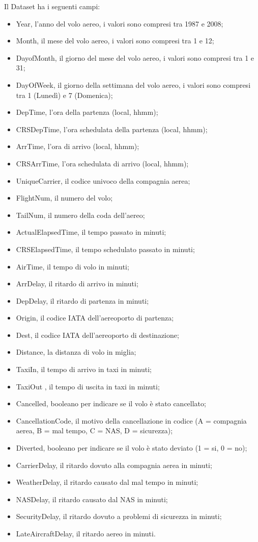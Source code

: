 \documentclass[11pt]{article} %
\begin{document}
Il Dataset ha i seguenti campi:
\begin{itemize}
\item    Year,  l'anno del volo aereo, i valori sono compresi tra 1987 e 2008;
\item    Month,  il mese del volo aereo, i valori sono compresi tra 1 e 12;
\item    DayofMonth, il giorno del mese del volo aereo, i valori sono compresi tra 1 e 31;
\item    DayOfWeek,  il giorno della settimana del volo aereo, i valori sono compresi tra 1 (Lunedì) e 7 (Domenica);
\item    DepTime, l'ora della partenza (local, hhmm);
\item    CRSDepTime, l'ora schedulata della partenza (local, hhmm);
\item    ArrTime, l'ora di arrivo (local, hhmm);
\item    CRSArrTime, l'ora schedulata di arrivo (local, hhmm);
\item    UniqueCarrier, il codice univoco della compagnia aerea;
\item   FlightNum, il numero del volo;
\item   TailNum, il numero della coda dell'aereo;
\item   ActualElapsedTime, il tempo passato in minuti;
\item   CRSElapsedTime, il tempo schedulato passato in minuti;
\item   AirTime, il tempo di volo in minuti;
\item   ArrDelay, il ritardo di arrivo in minuti;
\item   DepDelay, il ritardo di partenza in minuti;
\item   Origin, il codice IATA dell'aereoporto di partenza;
\item   Dest, il codice IATA dell'aereoporto di destinazione;
\item   Distance, la distanza di volo in miglia;
\item   TaxiIn, il tempo di arrivo in taxi in minuti;
\item   TaxiOut , il tempo di uscita in taxi in minuti;
\item   Cancelled, booleano per indicare se il volo è stato cancellato;
\item   CancellationCode, il motivo della cancellazione in codice (A = compagnia aerea, B = mal tempo, C = NAS, D = sicurezza);
\item   Diverted, booleano per indicare se il volo è stato deviato (1 = si, 0 = no);
\item   CarrierDelay, il ritardo dovuto alla compagnia aerea in minuti;
\item   WeatherDelay, il ritardo causato dal mal tempo in minuti;
\item   NASDelay, il ritardo causato dal NAS in minuti;
\item   SecurityDelay, il ritardo dovuto a problemi di sicurezza in minuti;
\item   LateAircraftDelay, il ritardo aereo in minuti.
\end{itemize}
\end{document}
